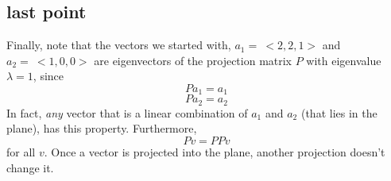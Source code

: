 \documentclass[11pt, oneside]{article}
\begin{document}
\subsection*{last point}
Finally, note that the vectors we started with, $a_1 = \ <2,2,1>$ and $a_2 = \ <1,0,0>$ are eigenvectors of the projection matrix $P$ with eigenvalue $\lambda = 1$, since 
\[ P a_1 = a_1 \]
\[ P a_2 = a_2 \]
In fact, \emph{any} vector that is a linear combination of $a_1$ and $a_2$ (that lies in the plane), has this property.  Furthermore,
\[ P v = P P v \]
for all $v$.  Once a vector is projected into the plane, another projection doesn't change it.
\end{document}
